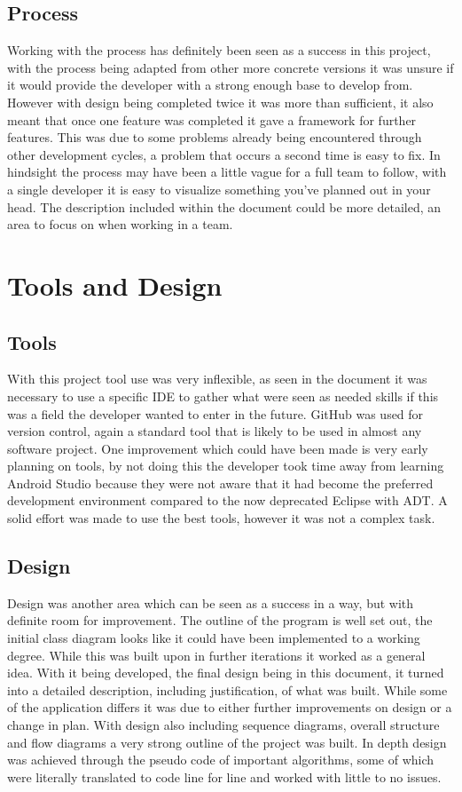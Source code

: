 \subsection{Process}
Working with the process has definitely been seen as a success in this project, with the process being adapted from other more concrete versions it was unsure if it would provide the developer with a strong enough base to develop from. However with design being completed twice it was more than sufficient, it also meant that once one feature was completed it gave a framework for further features. This was due to some problems already being encountered through other development cycles, a problem that occurs a second time is easy to fix. In hindsight the process may have been a little vague for a full team to follow, with a single developer it is easy to visualize something you've planned out in your head. The description included within the document could be more detailed, an area to focus on when working in a team. 
\section{Tools and Design}
\subsection{Tools}
With this project tool use was very inflexible, as seen in the document it was necessary to use a specific IDE to gather what were seen as needed skills if this was a field the developer wanted to enter in the future. GitHub was used for version control, again a standard tool that is likely to be used in almost any software project. One improvement which could have been made is very early planning on tools, by not doing this the developer took time away from learning Android Studio because they were not aware that it had become the preferred development environment compared to the now deprecated Eclipse with ADT. A solid effort was made to use the best tools, however it was not a complex task. 
\subsection{Design}
Design was another area which can be seen as a success in a way, but with definite room for improvement. The outline of the program is well set out, the initial class diagram looks like it could have been implemented to a working degree. While this was built upon in further iterations it worked as a general idea. With it being developed, the final design being in this document, it turned into a detailed description, including justification, of what was built. While some of the application differs it was due to either further improvements on design or a change in plan. With design also including sequence diagrams, overall structure and flow diagrams a very strong outline of the project was built. In depth design was achieved through the pseudo code of important algorithms, some of which were literally translated to code line for line and worked with little to no issues.

